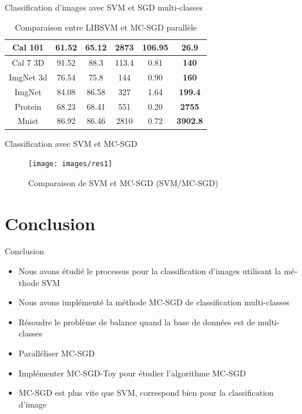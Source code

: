 \documentclass[11pt]{beamer}
\begin{document}
\begin{otherlanguage}{french}
\begin{frame}{Classification d'images avec SVM et SGD multi-classes}
\begin{table}
\begin{center}
\begin{tabular}{ | c | c | c | c | c | c |}
    Cal 101 & 61.52 & 65.12 & 2873 & 106.95 & \textbf{26.9} \\ \hline
    
    Cal 7 3D & 91.52 & 88.3 & 113.4 & 0.81 & \textbf{140} \\ \hline 

    ImgNet 3d & 76.54 & 75.8 & 144 & 0.90 & \textbf{160} \\ \hline
    
    ImgNet & 84.08 & 86.58 & 327 & 1.64 & \textbf{199.4} \\ \hline

    Protein & 68.23 & 68.41 & 551 & 0.20 & \textbf{2755} \\ \hline
    
    Mnist & 86.92 & 86.46 & 2810 & 0.72 & \textbf{3902.8} \\ \hline
    
    \end{tabular}
\end{center}
\caption{Comparaison entre LIBSVM et MC-SGD parallèle}
\label{tab:pmcsvm}
\end{table}
\end{frame}


\begin{frame}{Classification avec SVM et MC-SGD}
\begin{figure}[ht!]
\centering
\texttt{[image: images/res1]}
\caption{Comparaison de SVM et MC-SGD (SVM/MC-SGD)}
\label{fig:res}
\end{figure}
\end{frame}

\section{Conclusion}
\begin{frame}{Conclusion}
\begin{itemize}
\item Nous avons étudié le processus pour la classification d'images utilisant la méthode SVM
\pause
\item Nous avons implémenté la méthode MC-SGD de classification multi-classes
\pause
\item Résoudre le problème de balance quand la base de données est de multi-classes
\pause
\item Paralléliser MC-SGD
\pause
\item Implémenter MC-SGD-Toy pour étudier l'algorithme MC-SGD
\pause
\item MC-SGD est plus vite que SVM, correspond bien pour la classification d'image
\end{itemize}
\end{frame}


\end{otherlanguage}
\end{document}
